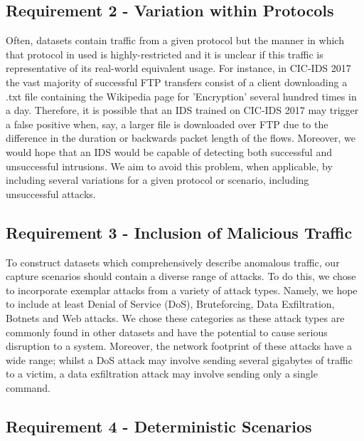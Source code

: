 \documentclass[msc,deptreport, cs]{infthesis} %
\begin{document}
\subsection{Requirement 2 - Variation within Protocols}

Often, datasets contain traffic from a given protocol but the manner in which that protocol in used is highly-restricted and it is unclear if this traffic is representative of its real-world equivalent usage. For instance, in CIC-IDS 2017 the vast majority of successful FTP transfers consist of a client downloading a .txt file containing the Wikipedia page for 'Encryption' several hundred times in a day. Therefore, it is possible that an IDS trained on CIC-IDS 2017 may trigger a false positive when, say, a larger file is downloaded over FTP due to the difference in the duration or backwards packet length of the flows. Moreover, we would hope that an IDS would be capable of detecting both successful and unsuccessful intrusions. We aim to avoid this problem, when applicable, by including several variations for a given protocol or scenario, including unsuccessful attacks.  

\subsection{Requirement 3 - Inclusion of Malicious Traffic}

To construct datasets which comprehensively describe anomalous traffic, our capture scenarios should contain a diverse range of attacks. To do this, we chose to incorporate exemplar attacks from a variety of attack types. Namely, we hope to include at least Denial of Service (DoS), Bruteforcing, Data Exfiltration, Botnets and Web attacks. We chose these categories as these attack types are commonly found in other datasets and have the potential to cause serious disruption to a system. Moreover, the network footprint of these attacks have a wide range; whilst a DoS attack may involve sending several gigabytes of traffic to a victim, a data exfiltration attack may involve sending only a single command.

\subsection{Requirement 4 - Deterministic Scenarios}
\label{sec:deterministic}
\end{document}
